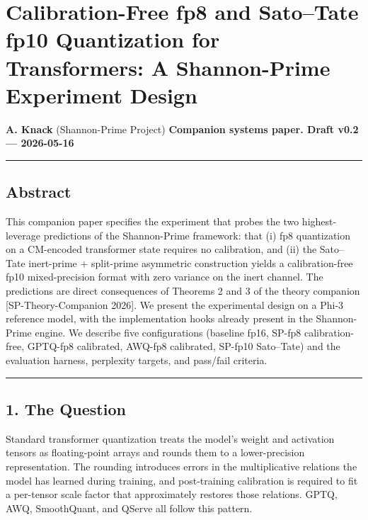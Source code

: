 \documentclass[
  11pt,
]{article}
\author{}
\date{}
\begin{document}
\hypertarget{calibration-free-fp8-and-satotate-fp10-quantization-for-transformers-a-shannon-prime-experiment-design}{%
\section{Calibration-Free fp8 and Sato--Tate fp10 Quantization for
Transformers: A Shannon-Prime Experiment
Design}\label{calibration-free-fp8-and-satotate-fp10-quantization-for-transformers-a-shannon-prime-experiment-design}}

\textbf{A. Knack} (Shannon-Prime Project) \textbf{Companion systems
paper. Draft v0.2 --- 2026-05-16}

\begin{center}\rule{0.5\linewidth}{0.5pt}\end{center}

\hypertarget{abstract}{%
\subsection{Abstract}\label{abstract}}

This companion paper specifies the experiment that probes the two
highest-leverage predictions of the Shannon-Prime framework: that (i)
fp8 quantization on a CM-encoded transformer state requires no
calibration, and (ii) the Sato--Tate inert-prime + split-prime
asymmetric construction yields a calibration-free fp10 mixed-precision
format with zero variance on the inert channel. The predictions are
direct consequences of Theorems 2 and 3 of the theory companion
{[}SP-Theory-Companion 2026{]}. We present the experimental design on a
Phi-3 reference model, with the implementation hooks already present in
the Shannon-Prime engine. We describe five configurations (baseline
fp16, SP-fp8 calibration-free, GPTQ-fp8 calibrated, AWQ-fp8 calibrated,
SP-fp10 Sato--Tate) and the evaluation harness, perplexity targets, and
pass/fail criteria.

\begin{center}\rule{0.5\linewidth}{0.5pt}\end{center}

\hypertarget{the-question}{%
\subsection{1. The Question}\label{the-question}}

Standard transformer quantization treats the model's weight and
activation tensors as floating-point arrays and rounds them to a
lower-precision representation. The rounding introduces errors in the
multiplicative relations the model has learned during training, and
post-training calibration is required to fit a per-tensor scale factor
that approximately restores those relations. GPTQ, AWQ, SmoothQuant, and
QServe all follow this pattern.
\end{document}
